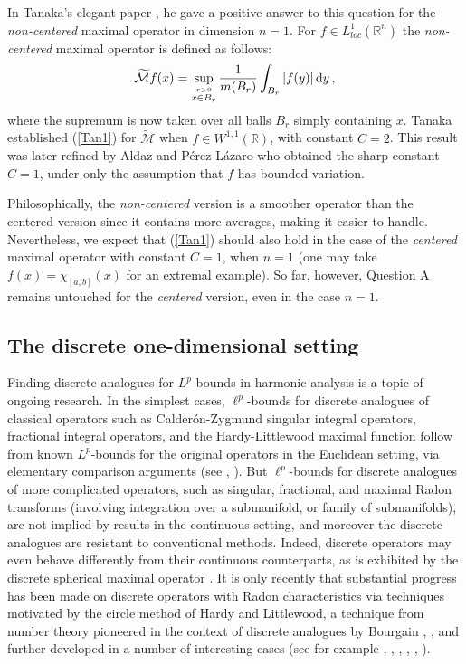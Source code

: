 \documentclass[reqno]{amsart}
\theoremstyle{definition}
\theoremstyle{remark}
\numberwithin{equation}{section}
\newcommand{\R}{\mathbb{R}}
\newcommand{\dy}{\text{\rm d}y}
\begin{document}
In Tanaka's elegant paper \cite{Ta}, he gave a positive answer to this question for the {\it non-centered} maximal operator in dimension $n=1$. For $f \in L^1_{loc}(\R^n)$ the {\it non-centered} maximal operator is defined as follows:
\begin{equation*}
\widetilde{\mathcal{M}} f(x) = \sup_{\stackrel{r>0}{x \in B_r}}\frac{1}{m(B_r)} \int_{B_r} |f(y)|\, \dy \,,
\end{equation*}
where the supremum is now taken over all balls $B_r$ simply containing $x$.
Tanaka established (\ref{Tan1}) for $\widetilde{\mathcal{M}}$ when $f \in W^{1,1}(\R)$, with constant $C=2$. This result was later refined by Aldaz and P\'{e}rez L\'{a}zaro \cite[Theorem 2.5]{AP} who obtained the sharp constant $C=1$, under only the assumption that $f$ has bounded variation.

Philosophically, the {\it non-centered} version is a smoother operator than the centered version since it contains more averages,  making it easier to handle. Nevertheless, we expect that (\ref{Tan1}) should also hold in the case of the {\it centered} maximal operator with constant $C=1$, when $n=1$ (one may take $f (x)= \chi_{[a,b]}(x)$ for an extremal example). So far, however, Question A remains untouched for the {\it centered} version, even in the case $n=1$. 



\subsection{The discrete one-dimensional setting} 
Finding discrete analogues for $L^p$-bounds in harmonic analysis is a topic of ongoing research. In the simplest cases, $\ell^p$-bounds for discrete analogues of classical operators such as Calder\'{o}n-Zygmund singular integral operators, fractional integral operators, and the Hardy-Littlewood maximal function follow from known $L^p$-bounds for the original operators in the Euclidean setting,  via elementary comparison arguments (see \cite{SW1}, \cite{SW2}). But $\ell^p$-bounds for discrete analogues of more complicated operators, such as singular, fractional, and maximal Radon transforms (involving integration over a submanifold, or family of submanifolds), are not implied by results in the continuous setting, and moreover the discrete analogues are resistant to conventional methods. Indeed, discrete operators may even behave differently from their continuous counterparts, as is exhibited by the discrete spherical maximal operator \cite{MSW}.
It is only recently that substantial progress has been made on discrete operators with Radon characteristics via techniques motivated by the circle method of Hardy and Littlewood, a technique from number theory  pioneered in the context of discrete analogues by Bourgain \cite{Bour88A}, \cite{Bour88B}, and  further developed in a number of interesting cases (see for example \cite{IMSW}, \cite{IW}, \cite{MSW}, \cite{Pie10},  \cite{SW1}, \cite{SW2}).
\end{document}
